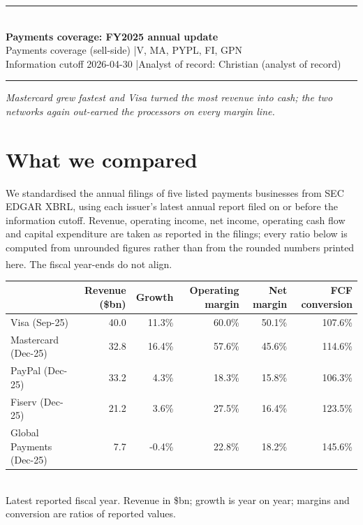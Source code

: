 \documentclass[10pt]{article}
\begin{document}
\begin{center}
{\color{desk}\rule{\textwidth}{0.9pt}}\\[3pt]
{\LARGE\bfseries\color{desk} Payments coverage: FY2025 annual update}\\[2pt]
{\small Payments coverage (sell-side) \quad|\quad V, MA, PYPL, FI, GPN}\\[1pt]
{\footnotesize Information cutoff 2026-04-30 \quad|\quad Analyst of record: Christian (analyst of record)}
\\[1pt]{\color{desk}\rule{\textwidth}{0.4pt}}
\end{center}
\vspace{-4pt}
{\small\itshape Mastercard grew fastest and Visa turned the most revenue into cash; the two networks again out-earned the processors on every margin line.}
\vspace{2pt}
\section*{What we compared}
We standardised the annual filings of five listed payments businesses from SEC EDGAR XBRL, using each issuer's latest annual report filed on or before the information cutoff. Revenue, operating income, net income, operating cash flow and capital expenditure are taken as reported in the filings; every ratio below is computed from unrounded figures rather than from the rounded numbers printed here. The fiscal year-ends do not align.\textsuperscript{\dag}\par
\begin{center}\footnotesize
\begin{tabular}{lrrrrr}
\toprule
\textbf{} & \textbf{Revenue (\$bn)} & \textbf{Growth} & \textbf{Operating margin} & \textbf{Net margin} & \textbf{FCF conversion} \\
\midrule
Visa (Sep-25) & 40.0 & 11.3\% & 60.0\% & 50.1\% & 107.6\% \\
Mastercard (Dec-25) & 32.8 & 16.4\% & 57.6\% & 45.6\% & 114.6\% \\
PayPal (Dec-25) & 33.2 & 4.3\% & 18.3\% & 15.8\% & 106.3\% \\
Fiserv (Dec-25) & 21.2 & 3.6\% & 27.5\% & 16.4\% & 123.5\% \\
Global Payments (Dec-25) & 7.7 & -0.4\% & 22.8\% & 18.2\% & 145.6\% \\
\bottomrule
\end{tabular}
\\[1pt]{\scriptsize\color{black!65}Latest reported fiscal year. Revenue in \$bn; growth is year on year; margins and conversion are ratios of reported values.}
\end{center}
\end{document}
